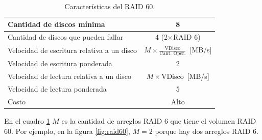 \begin{table}[!ht]
  \centering
  \begin{tabular}{l|c}
    Cantidad de discos mínima & 8 \\\hline
    Cantidad de discos que pueden fallar & 4 (2\(\times\)RAID 6) \\ \hline
    Velocidad de escritura relativa a un disco & \(M\times\frac{\text{VDisco}}{\text{Cant. Oper.}}\)~[MB/s] \\\hline
    Velocidad de escritura ponderada & 2 \\ \hline
    Velocidad de lectura relativa a un disco & \(M\times\)VDisco~[MB/s] \\ \hline
    Velocidad de lectura ponderada & 5 \\ \hline
    Costo & Alto
  \end{tabular}
  \caption{Características del RAID 60.}
  \label{tab:raid60}
\end{table}

En el cuadro \ref{tab:raid60} \(M\) es la cantidad de arreglos RAID 6 que tiene el volumen RAID 60. Por ejemplo, en la figura \ref{fig:raid60}, \(M=2\) porque hay dos arreglos RAID 6.
